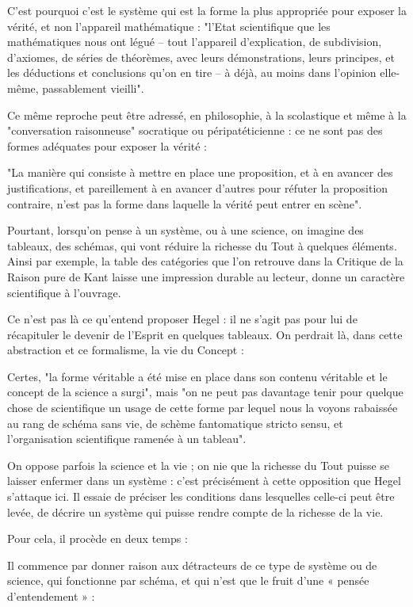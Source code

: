 C’est pourquoi c’est le système qui est la forme la plus appropriée pour exposer la vérité, et non l’appareil mathématique : "l’Etat scientifique que les mathématiques nous ont légué – tout l’appareil d’explication, de subdivision, d’axiomes, de séries de théorèmes, avec leurs démonstrations, leurs principes, et les déductions et conclusions qu’on en tire – à déjà, au moins dans l’opinion elle-même, passablement vieilli".

Ce même reproche peut être adressé, en philosophie, à la scolastique et même à la "conversation raisonneuse" socratique ou péripatéticienne : ce ne sont pas des formes adéquates pour exposer la vérité :

"La manière qui consiste à mettre en place une proposition, et à en avancer des justifications, et pareillement à en avancer d’autres pour réfuter la proposition contraire, n’est pas la forme dans laquelle la vérité peut entrer en scène".

Pourtant, lorsqu’on pense à un système, ou à une science, on imagine des tableaux, des schémas, qui vont réduire la richesse du Tout à quelques éléments. Ainsi par exemple, la table des catégories que l’on retrouve dans la Critique de la Raison pure de Kant laisse une impression durable au lecteur, donne un caractère scientifique à l’ouvrage.

Ce n’est pas là ce qu’entend proposer Hegel : il ne s’agit pas pour lui de récapituler le devenir de l’Esprit en quelques tableaux. On perdrait là, dans cette abstraction et ce formalisme, la vie du Concept :

Certes, "la forme véritable a été mise en place dans son contenu véritable et le concept de la science a surgi", mais "on ne peut pas davantage tenir pour quelque chose de scientifique un usage de cette forme par lequel nous la voyons rabaissée au rang de schéma sans vie, de schème fantomatique stricto sensu, et l’organisation scientifique ramenée à un tableau".

On oppose parfois la science et la vie ; on nie que la richesse du Tout puisse se laisser enfermer dans un système : c’est précisément à cette opposition que Hegel s’attaque ici. Il essaie de préciser les conditions dans lesquelles celle-ci peut être levée, de décrire un système qui puisse rendre compte de la richesse de la vie.

Pour cela, il procède en deux temps :

Il commence par donner raison aux détracteurs de ce type de système ou de science, qui fonctionne par schéma, et qui n’est que le fruit d’une « pensée d’entendement » :

